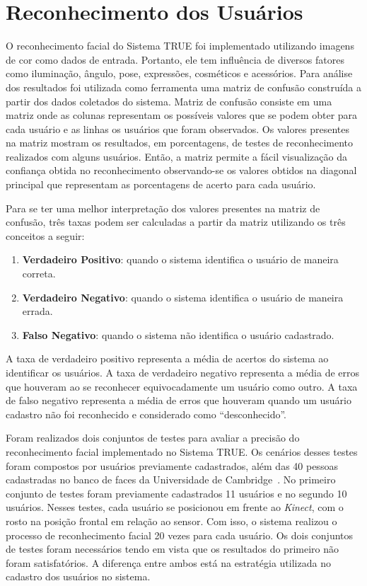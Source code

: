 \section{Reconhecimento dos Usuários}
	 
	O reconhecimento facial do Sistema TRUE foi implementado utilizando imagens de cor como dados de entrada. Portanto, ele tem influência de diversos fatores como iluminação, ângulo, pose, expressões, cosméticos e acessórios. Para análise dos resultados foi utilizada como ferramenta uma matriz de confusão construída a partir dos dados coletados do sistema. Matriz de confusão consiste em uma matriz onde as colunas representam os possíveis valores que se podem obter para cada usuário e as linhas os usuários que foram observados. Os valores presentes na matriz mostram os resultados, em porcentagens, de testes de reconhecimento realizados com alguns usuários. Então, a matriz permite a fácil visualização da confiança obtida no reconhecimento observando-se os valores obtidos na diagonal principal que representam as porcentagens de acerto para cada usuário.

	Para se ter uma melhor interpretação dos valores presentes na matriz de confusão, três taxas podem ser calculadas a partir da matriz utilizando os três conceitos a seguir:

	\begin{enumerate}
		\item \textbf{Verdadeiro Positivo}: quando o sistema identifica o usuário de maneira correta.
		\item \textbf{Verdadeiro Negativo}: quando o sistema identifica o usuário de maneira errada.
		\item \textbf{Falso Negativo}: quando o sistema não identifica o usuário cadastrado.
	\end{enumerate}

	A taxa de verdadeiro positivo representa a média de acertos do sistema ao identificar os usuários. A taxa de verdadeiro negativo representa a média de erros que houveram ao se reconhecer equivocadamente um usuário como outro. A taxa de falso negativo representa a média de erros que houveram quando um usuário cadastro não foi reconhecido e considerado como ``desconhecido''.

	Foram realizados dois conjuntos de testes para avaliar a precisão do reconhecimento facial implementado no Sistema TRUE. Os cenários desses testes foram compostos por usuários previamente cadastrados, além das 40 pessoas cadastradas no banco de faces da Universidade de Cambridge~\cite{cambridgeFaceDb}. No primeiro conjunto de testes foram previamente cadastrados 11 usuários e no segundo 10 usuários. Nesses testes, cada usuário se posicionou em frente ao \textit{Kinect}, com o rosto na posição frontal em relação ao sensor. Com isso, o sistema realizou o processo de reconhecimento facial 20 vezes para cada usuário. Os dois conjuntos de testes foram necessários tendo em vista que os resultados do primeiro não foram satisfatórios. A diferença entre ambos está na estratégia utilizada no cadastro dos usuários no sistema. 

